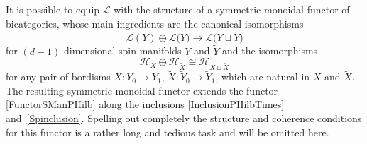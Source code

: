 \documentclass[10pt,a4paper]{amsart}
\numberwithin{equation}{section}
\begin{document}
It is possible to equip $\mathcal{L}$ with the structure of a symmetric monoidal functor of bicategories, whose main ingredients are the canonical isomorphisms
\begin{equation*}
 \mathcal{L}(Y) \oplus \mathcal{L}\big(\tilde{Y}\big) \longrightarrow \mathcal{L}\big(Y \sqcup \tilde{Y}\big)
\end{equation*}
for $(d-1)$-dimensional spin manifolds $Y$ and $\tilde{Y}$ and the isomorphisms
\begin{equation*}
 \mathcal{H}_{X} \oplus \mathcal{H}_{\tilde{X}} \cong \mathcal{H}_{X \sqcup \tilde{X}}
\end{equation*}
for any pair of bordisms $X \colon Y_0 \to Y_1$, $\tilde{X} \colon \tilde{Y}_0 \to \tilde{Y}_1$, which are natural in $X$ and $\tilde{X}$.
The resulting symmetric monoidal functor extends the functor \eqref{FunctorSManPHilb} along the inclusions \eqref{InclusionPHilbTimes} and~\eqref{Spinclusion}.
Spelling out completely the structure and coherence conditions for this functor is a rather long and tedious task and will be omitted here.
\end{document}
